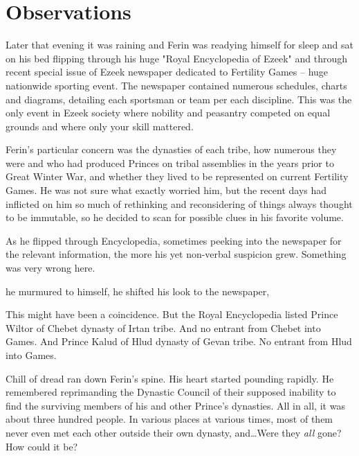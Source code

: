
\section{Observations}

Later that evening it was raining and Ferin was readying himself for sleep and sat on his bed flipping through his huge "Royal Encyclopedia of Ezeek" and through recent special issue of Ezeek newspaper dedicated to Fertility Games -- huge nationwide sporting event. The newspaper contained numerous schedules, charts and diagrams, detailing each sportsman or team per each discipline. This was the only event in Ezeek society where nobility and peasantry competed on equal grounds and where only your skill mattered.

Ferin's particular concern was the dynasties of each tribe, how numerous they were and who had produced Princes on tribal assemblies in the years prior to Great Winter War, and whether they lived to be represented on current Fertility Games. He was not sure what exactly worried him, but the recent days had inflicted on him so much of rethinking and reconsidering of things always thought to be immutable, so he decided to scan for possible clues in his favorite volume.

As he flipped through Encyclopedia, sometimes peeking into the newspaper for the relevant information, the more his yet non-verbal suspicion grew. Something was very wrong here.

 he murmured to himself,  he shifted his look to the newspaper, 

This might have been a coincidence. But the Royal Encyclopedia listed Prince Wiltor of Chebet dynasty of Irtan tribe. And no entrant from Chebet into Games. And Prince Kalud of Hlud dynasty of Gevan tribe. No entrant from Hlud into Games.

Chill of dread ran down Ferin's spine. His heart started pounding rapidly. He remembered reprimanding the Dynastic Council of their supposed inability to find the surviving members of his and other Prince's dynasties. All in all, it was about three hundred people. In various places at various times, most of them never even met each other outside their own dynasty, and\dots Were they \textit{all} gone? How could it be?

